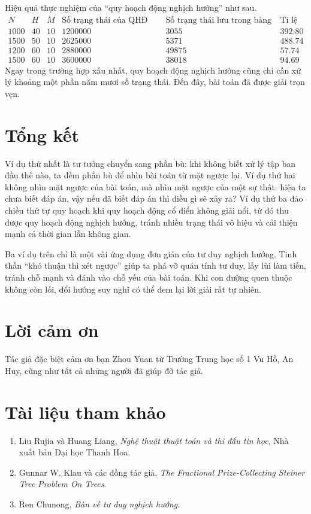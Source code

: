 \documentclass[11pt]{article}
\begin{document}
Hiệu quả thực nghiệm của ``quy hoạch động nghịch hướng'' như sau.
\[
\begin{array}{c|c|c|r|r|r}
N & H & M & \text{Số trạng thái của QHĐ thuận}
  & \text{Số trạng thái lưu trong bảng băm}
  & \text{Tỉ lệ}\\ \hline
1000 & 40 & 10 & 1200000 & 3055  & 392.80\\
1500 & 50 & 10 & 2625000 & 5371  & 488.74\\
1200 & 60 & 10 & 2880000 & 49875 & 57.74\\
1500 & 60 & 10 & 3600000 & 38018 & 94.69
\end{array}
\]
Ngay trong trường hợp xấu nhất, quy hoạch động nghịch hướng cũng chỉ cần xử
lý khoảng một phần năm mươi số trạng thái. Đến đây, bài toán đã được giải
trọn vẹn.

\section{Tổng kết}

Ví dụ thứ nhất là tư tưởng chuyển sang phần bù: khi không biết xử lý tập ban
đầu thế nào, ta đếm phần bù để nhìn bài toán từ mặt ngược lại. Ví dụ thứ hai
không nhìn mặt ngược của bài toán, mà nhìn mặt ngược của một sự thật: hiện ta
chưa biết đáp án, vậy nếu đã biết đáp án thì điều gì sẽ xảy ra? Ví dụ thứ ba
đảo chiều thứ tự quy hoạch khi quy hoạch động cổ điển không giải nổi, từ đó
thu được quy hoạch động nghịch hướng, tránh nhiều trạng thái vô hiệu và cải
thiện mạnh cả thời gian lẫn không gian.

Ba ví dụ trên chỉ là một vài ứng dụng đơn giản của tư duy nghịch hướng. Tinh
thần ``khó thuận thì xét ngược'' giúp ta phá vỡ quán tính tư duy, lấy lùi làm
tiến, tránh chỗ mạnh và đánh vào chỗ yếu của bài toán. Khi con đường quen
thuộc không còn lối, đổi hướng suy nghĩ có thể đem lại lời giải rất tự nhiên.

\section*{Lời cảm ơn}

Tác giả đặc biệt cảm ơn bạn Zhou Yuan từ Trường Trung học số 1 Vu Hồ, An Huy,
cũng như tất cả những người đã giúp đỡ tác giả.

\section*{Tài liệu tham khảo}

\begin{enumerate}
  \item Liu Rujia và Huang Liang, \textit{Nghệ thuật thuật toán và thi đấu tin
  học}, Nhà xuất bản Đại học Thanh Hoa.
  \item Gunnar W. Klau và các đồng tác giả, \textit{The Fractional
  Prize-Collecting Steiner Tree Problem On Trees}.
  \item Ren Chunong, \textit{Bàn về tư duy nghịch hướng}.
\end{enumerate}
\end{document}
